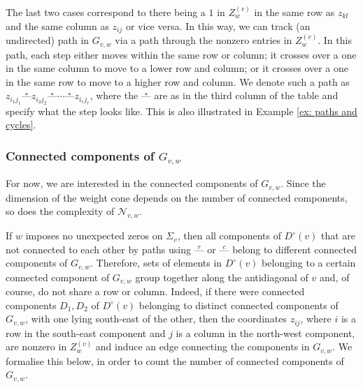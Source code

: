 \documentclass[11pt]{amsart}
\theoremstyle{definition}
\theoremstyle{definition}
\theoremstyle{definition}
\theoremstyle{definition}
\newcommand{\Gvwt}{G_{v,w}}
\newcommand{\Nvw}{\mathcal{N}_{v,w}}
\newcommand{\Dc}{D^{\circ}}
\newcommand{\dash}{\text{---}}
\newcommand{\Zg}{Z^{(v)}_w}
\begin{document}
\noindent The last two cases correspond to there being a $1$ in $\Zg$ in the same row as $z_{kl}$ and the same column as $z_{ij}$ or vice versa. In this way, we can track (an undirected) path in $\Gvwt$ via a path through the nonzero entries in $\Zg$. In this path, each step either moves within the same row or column; it crosses over a one in the same column to move to a lower row and column; or it crosses over a one in the same row to move to a higher row and column. We denote such a path as 
$z_{i_1 j_1} \stackrel{\ast}{\dash} z_{i_2 j_2} \stackrel{\ast}{\dash} \cdots \stackrel{\ast}{\dash} z_{i_r j_r}$, where the $\stackrel{\ast}{\dash}$ are as in the third column of the table and specify what the step looks like. This is also illustrated in Example \ref{ex: paths and cycles}.

\subsubsection{Connected components of $\Gvwt$}

\noindent For now, we are interested in the connected components of $\Gvwt$. Since the dimension of the weight cone depends on the number of connected components, so does the complexity of $\Nvw$. 

If $w$ imposes no unexpected zeros on $\Sigma_v$, then all components of $\Dc(v)$ that are not connected to each other by paths using $\stackrel{r}{\dash}$ or $\stackrel{c}{\dash}$ belong to different connected components of $\Gvwt$. Therefore, sets of elements in $\Dc(v)$ belonging to a certain connected component of $\Gvwt$ group together along the antidiagonal of $v$ and, of course, do not share a row or column. Indeed, if there were connected components $D_1, D_2$ of $\Dc(v)$ belonging to distinct connected components of $\Gvwt$, with one lying south-east of the other, then the coordinates $z_{ij}$, where $i$ is a row in the south-east component and $j$ is a column in the north-west component, are nonzero in $\Zg$ and induce an edge connecting the components in $\Gvwt$. We formalise this below, in order to count the number of connected components of $\Gvwt$.
\end{document}
